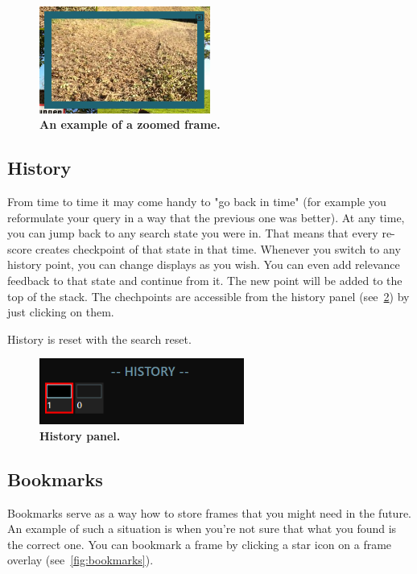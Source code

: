 \begin{figure}[h]
	\centering
	\includegraphics[width=0.5\textwidth]{img/zoom.png}
  \caption{\textbf{An example of a zoomed frame.}}
	\label{fig:zoom}
\end{figure}

\subsection{History}
From time to time it may come handy to "go back in time" (for example you reformulate your query in a way that the previous one was better). At any time, you can jump back to any search state you were in. That means that every re-score creates checkpoint of that state in that time. Whenever you switch to any history point, you can change displays as you wish. You can even add relevance feedback to that state and continue from it. The new point will be added to the top of the stack. The chechpoints are accessible from the history panel (see~\cref{fig:history}) by just clicking on them.

History is reset with the search reset.

\begin{figure}[h]
	\centering
	\includegraphics[width=0.6\textwidth]{img/history-panel.png}
  \caption{\textbf{History panel.}}
	\label{fig:history}
\end{figure}

\subsection{Bookmarks}
Bookmarks serve as a way how to store frames that you might need in the future. An example of such a situation is when you're not sure that what you found is the correct one. You can bookmark a frame by clicking a star icon on a frame overlay (see~\cref{fig:bookmarks}). 

